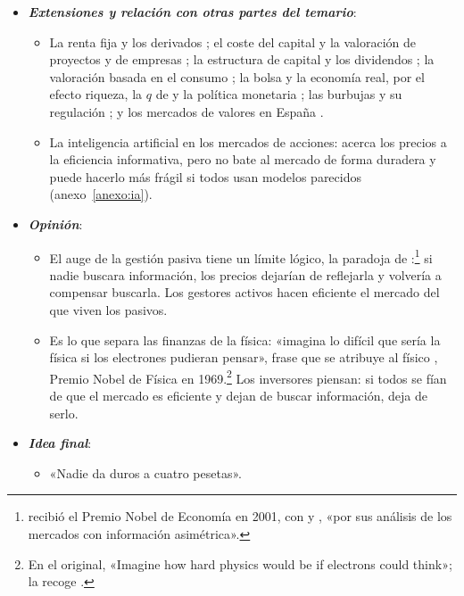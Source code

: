 \documentclass[11pt]{article}
\begin{document}
\begin{itemize}
\begin{itemize}
  \item Y todos tienen un componente subjetivo: que los inversores valoren distinto es lo que hace que los mercados sean líquidos y profundos.
  \end{itemize}
\item \textbf{\emph{Extensiones y relación con otras partes del temario}}:
  \begin{itemize}
  \item La renta fija  y los derivados ; el coste del capital y la valoración de proyectos y de empresas  ; la estructura de capital y los dividendos ; la valoración basada en el consumo ; la bolsa y la economía real, por el efecto riqueza, la $q$ de  y la política monetaria  ; las burbujas y su regulación  ; y los mercados de valores en España .
  \item La inteligencia artificial en los mercados de acciones: acerca los precios a la eficiencia informativa, pero no bate al mercado de forma duradera y puede hacerlo más frágil si todos usan modelos parecidos (anexo~\ref{anexo:ia}).
  \end{itemize}
\item \textbf{\emph{Opinión}}:
  \begin{itemize}
  \item El auge de la gestión pasiva tiene un límite lógico, la paradoja de \textcite{GrossmanStiglitz1980}:\footnote{ recibió el Premio Nobel de Economía en 2001, con  y , «por sus análisis de los mercados con información asimétrica»\nocite{Nobel2001AkerlofSpenceStiglitz}.} si nadie buscara información, los precios dejarían de reflejarla y volvería a compensar buscarla. Los gestores activos hacen eficiente el mercado del que viven los pasivos.

  \item Es lo que separa las finanzas de la física: «imagina lo difícil que sería la física si los electrones pudieran pensar», frase que se atribuye al físico , Premio Nobel de Física en 1969.\footnote{En el original, «Imagine how hard physics would be if electrons could think»; la recoge \textcite{Page1999Computational}.} Los inversores piensan: si todos se fían de que el mercado es eficiente y dejan de buscar información, deja de serlo.
  \end{itemize}
\item \textbf{\emph{Idea final}}:
  \begin{itemize}
  \item «Nadie da duros a cuatro pesetas».


\end{itemize}
\end{itemize}
\end{document}
